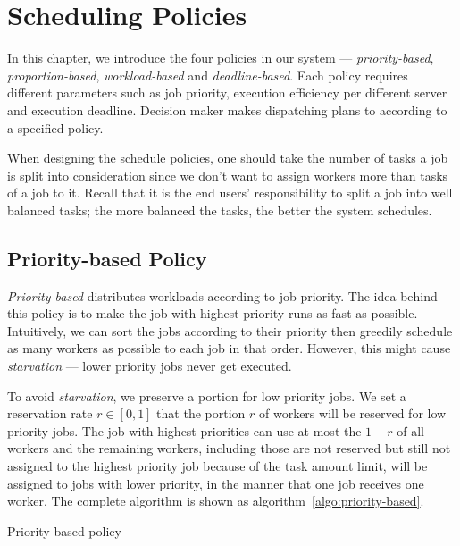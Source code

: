 \section{Scheduling Policies}\label{sec:policy}

In this chapter, we introduce the four policies in our system ---
\emph{priority-based}, \emph{proportion-based}, \emph{workload-based}
and \emph{deadline-based}.
Each policy requires different parameters such as job priority,
execution efficiency per different server and execution deadline.
Decision maker makes dispatching plans to according to a specified
policy.

When designing the schedule policies, one should take the number of
tasks a job is split into consideration since we don't want to assign
workers more than tasks of a job to it.
Recall that it is the end users' responsibility to split a job into well
balanced tasks; the more balanced the tasks, the better the system
schedules.


\subsection{Priority-based Policy}

\emph{Priority-based} distributes workloads according to job priority. 
The idea behind this policy is to make the job with highest priority runs as
fast as possible.
Intuitively, we can sort the jobs according to their priority then greedily
schedule as many workers as possible to each job in that order.
However, this might cause \emph{starvation} --- lower priority jobs
never get executed.


To avoid \emph{starvation}, we preserve a portion for low priority jobs.
We set a reservation rate $r \in [0,1]$ that the portion $r$ of workers
will be reserved for low priority jobs.
The job with highest priorities can use at most the $1-r$ of all workers
and the remaining workers, including those are not reserved but still not
assigned to the highest priority job because of the task amount limit,
will be assigned to jobs with lower priority, in the manner that one job
receives one worker.
The complete algorithm is shown as algorithm~\ref{algo:priority-based}.

\begin{algorithm}[H]
  
  \caption{Priority-based policy}
  \label{algo:priority-based}
\end{algorithm}

